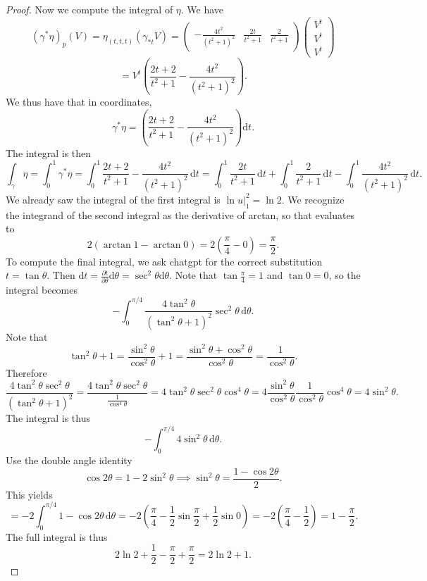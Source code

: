\documentclass[11pt, letterpaper]{article}
\begin{document}
\begin{proof}
Now we compute the integral of $\eta $. We have
\[
	(\gamma ^*\eta )_p(V) = \eta _{(t,t,t)} (\gamma _{*t} V)=\begin{pmatrix}
		\displaystyle{-\frac{4t^2}{\left( t^2+1 \right) ^2} } & \displaystyle{\frac{2t}{t^2+1} } & \displaystyle{\frac{2}{t^2+1} }
	\end{pmatrix}\begin{pmatrix}
	V^t \\
	V^t \\
	V^t
	\end{pmatrix}
\]
\[
	=V^t\left( \frac{2t+2}{t^2+1} -\frac{4t^2}{\left( t^2+1 \right) ^2}  \right) 
.\]
We thus have that in coordinates,
\[
	\gamma ^*\eta =\left(\frac{2t+2}{t^2+1} -\frac{4t^2}{\left( t^2+1 \right) ^2} \right)\mathrm{d} t
.\]
The integral is then
\[
\int_\gamma \eta =\int_0^1 \gamma ^*\eta = \int_{0}^{1} \frac{2t+2}{t^2+1} -\frac{4t^2}{\left( t^2+1 \right) ^2}  \,\mathrm{d} t=\int_0^1\frac{2t}{t^2+1}  \,\mathrm{d} t +\int_{0}^{1} \frac{2}{t^2+1}  \,\mathrm{d} t- \int_{0}^{1} \frac{4t^2}{\left( t^2+1 \right) ^2}  \,\mathrm{d} t
.\]
We already saw the integral of the first integral is $\ln u|_1^2 =\ln 2$. We recognize the integrand of the second integral as the derivative of arctan, so that evaluates to 
\[
	2 \left( \arctan 1 - \arctan 0 \right) =2\left( \frac{\pi }{4} -0 \right) =\frac{\pi }{2} 
.\]
To compute the final integral, we ask chatgpt for the correct substitution $t=\tan \theta $. Then $\mathrm{d} t = \frac{\partial t}{\partial \theta } \mathrm{d} \theta = \sec ^2 \theta \mathrm{d} \theta $. Note that $\tan \frac{\pi }{4} =1$ and $\tan 0=0$, so the integral becomes
\[
	-\int_{0}^{\pi /4} \frac{4 \tan ^2\theta }{\left( \tan ^2\theta +1 \right) ^2} \sec ^2\theta  \,\mathrm{d} \theta.
\]
Note that
\[
	\tan ^2\theta +1 = \frac{\sin ^2\theta }{\cos ^2\theta } +1  = \frac{\sin ^2\theta +\cos ^2\theta }{\cos ^2\theta } =\frac{1}{\cos ^2\theta } 
.\]
Therefore
\[
	\frac{4 \tan ^2\theta \sec ^2\theta }{\left( \tan ^2\theta +1 \right) ^2} =\frac{4 \tan ^2\theta \sec ^2\theta }{\frac{1}{\cos ^4\theta } } =4 \tan ^2\theta \sec ^2\theta \cos ^4\theta =4\frac{\sin ^2\theta }{\cos ^2\theta } \frac{1}{\cos ^2\theta } \cos ^4\theta =4\sin ^2\theta 
.\]
The integral is thus
\[
	-\int_{0}^{\pi /4} 4\sin ^2\theta  \,\mathrm{d} \theta 
.\]
Use the double angle identity
\[
	\cos 2\theta =1-2 \sin ^2\theta  \implies \sin ^2\theta  = \frac{1-\cos 2\theta }{2} 
.\]
This yields
\[
	=-2\int_{0}^{\pi /4} 1-\cos 2\theta  \,\mathrm{d} \theta =-2\left( \frac{\pi }{4} - \frac{1}{2} \sin \frac{\pi }{2} +\frac{1}{2} \sin 0 \right) =-2\left( \frac{\pi }{4}-\frac{1}{2} \right) =1-\frac{\pi }{2}
.\]
The full integral is thus
\[
	2 \ln 2+\frac{1}{2} -\frac{\pi }{2} + \frac{\pi }{2} =2 \ln 2 + 1
.\]


\end{proof}
\end{document}

